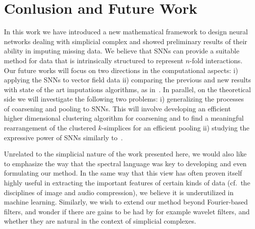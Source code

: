 \section{Conlusion and Future Work}

In this work we have introduced a new mathematical framework to design neural networks dealing with simplicial complex and showed preliminary results of their ability in imputing missing data. We believe that SNNs can provide a suitable method for data that is intrinsically structured to represent $n$-fold interactions.
Our future works will focus on two directions in the computational aspects:  i) applying the SNNs to vector field data ii) comparing the previous and new results with state of the art imputations algorithms, as in~\cite{spinelli2020neural}. 
In parallel, on the theoretical side we will investigate the following two problems: i) generalizing the processes of coarsening and pooling to SNNs. This will involve developing an efficient higher dimensional clustering algorithm for coarsening and to find a meaningful rearrangement of the clustered $k$-simplices for an efficient pooling ii) studying the expressive power of SNNs similarly to~\cite{morris2019weisfeiler}.

Unrelated to the simplicial nature of the work presented here, we would also like to emphasize the way that the spectral language was key to developing and even formulating our method. In the same way that this view has often proven itself highly useful in extracting the important features of certain kinds of data (cf.\ the disciplines of image and audio compression), we believe it is underutilized in machine learning. Similarly, we wish to extend our method beyond Fourier-based filters, and wonder if there are gains to be had by for example wavelet filters, and whether they are natural in the context of simplicial complexes.




